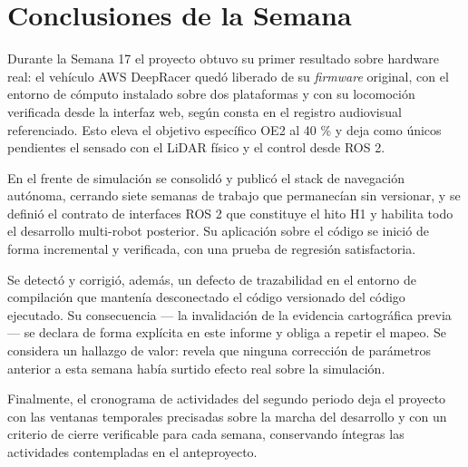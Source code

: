 \documentclass[12pt,letterpaper]{article}
\begin{document}
\section{Conclusiones de la Semana}

Durante la Semana 17 el proyecto obtuvo su primer resultado sobre hardware real: el vehículo AWS DeepRacer quedó liberado de su \textit{firmware} original, con el entorno de cómputo instalado sobre dos plataformas y con su locomoción verificada desde la interfaz web, según consta en el registro audiovisual referenciado. Esto eleva el objetivo específico OE2 al 40 \% y deja como únicos pendientes el sensado con el LiDAR físico y el control desde ROS 2.

En el frente de simulación se consolidó y publicó el stack de navegación autónoma, cerrando siete semanas de trabajo que permanecían sin versionar, y se definió el contrato de interfaces ROS 2 que constituye el hito H1 y habilita todo el desarrollo multi-robot posterior. Su aplicación sobre el código se inició de forma incremental y verificada, con una prueba de regresión satisfactoria.

Se detectó y corrigió, además, un defecto de trazabilidad en el entorno de compilación que mantenía desconectado el código versionado del código ejecutado. Su consecuencia --- la invalidación de la evidencia cartográfica previa --- se declara de forma explícita en este informe y obliga a repetir el mapeo. Se considera un hallazgo de valor: revela que ninguna corrección de parámetros anterior a esta semana había surtido efecto real sobre la simulación.

Finalmente, el cronograma de actividades del segundo periodo deja el proyecto con las ventanas temporales precisadas sobre la marcha del desarrollo y con un criterio de cierre verificable para cada semana, conservando íntegras las actividades contempladas en el anteproyecto.
\end{document}
